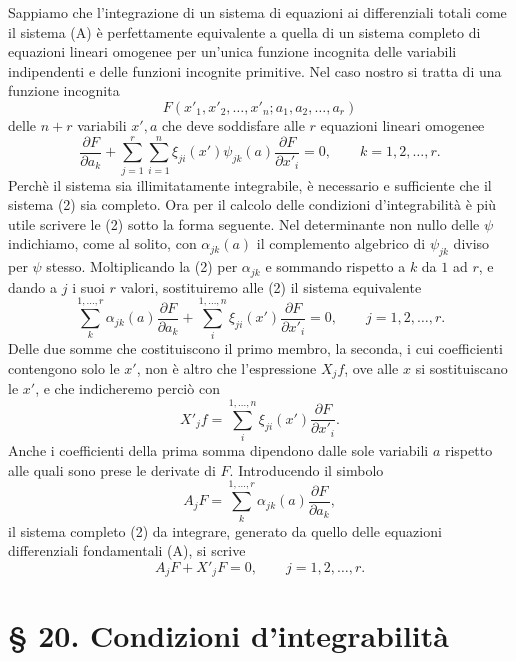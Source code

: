 \documentclass[11pt]{book}
\begin{document}
Sappiamo che l'integrazione di un sistema di equazioni ai differenziali totali come il sistema (A) è perfettamente equivalente a quella di un sistema completo di equazioni lineari omogenee per un'unica funzione incognita delle variabili indipendenti e delle funzioni incognite primitive. Nel caso nostro si tratta di una funzione incognita
\[
 F(x'_1,x'_2,\ldots,x'_n; a_1,a_2,\ldots,a_r)
\]
delle $n+r$ variabili $x',a$ che deve soddisfare alle $r$ equazioni lineari omogenee
\begin{equation*}\tag{2}
 \frac{\partial F}{\partial a_k}+\sum\limits_{j=1}^r\sum\limits_{i=1}^n\xi_{ji}(x')\psi_{jk}(a)\frac{\partial F}{\partial x'_i}=0,
 \qquad k=1,2,\ldots,r.
\end{equation*}
Perchè il sistema sia illimitatamente integrabile, è necessario e sufficiente che il sistema (2) sia completo. Ora per il calcolo delle condizioni d'integrabilità è più utile scrivere le (2) sotto la forma seguente. Nel determinante non nullo delle $\psi$ indichiamo, come al solito, con $\alpha_{jk}(a)$ il complemento algebrico di $\psi_{jk}$ diviso per $\psi$ stesso. Moltiplicando la (2) per $\alpha_{jk}$ e sommando rispetto a $k$ da $1$ ad $r$, e dando a $j$ i suoi $r$ valori, sostituiremo alle (2) il sistema equivalente
\begin{equation*}\tag{2*}
 \sum\limits_k^{1,\ldots,r}\alpha_{jk}(a)\frac{\partial F}{\partial a_k}+\sum\limits_i^{1,\ldots,n}\xi_{ji}(x')\frac{\partial F}{\partial x'_i}=0,
 \qquad j=1,2,\ldots,r.
\end{equation*}
Delle due somme che costituiscono il primo membro, la seconda, i cui coefficienti contengono solo le $x'$, non è altro che l'espressione $X_jf$, ove alle $x$ si sostituiscano le $x'$, e che indicheremo perciò con
\[
 X'_jf=\sum\limits_i^{1,\ldots,n}\xi_{ji}(x')\frac{\partial F}{\partial x'_i}.
\]
Anche i coefficienti della prima somma dipendono dalle sole variabili $a$ rispetto alle quali sono prese le derivate di $F$. Introducendo il simbolo
\begin{equation*}\tag{3}
 A_jF=\sum\limits_k^{1,\ldots,r}\alpha_{jk}(a)\frac{\partial F}{\partial a_k},
\end{equation*}
il sistema completo (2) da integrare, generato da quello delle equazioni differenziali fondamentali (A), si scrive
\begin{equation*}\tag{C'}
 A_jF+X'_jF=0,\qquad j=1,2,\ldots,r.
\end{equation*}

\section*{\S{} 20. Condizioni d'integrabilità}
\end{document}
